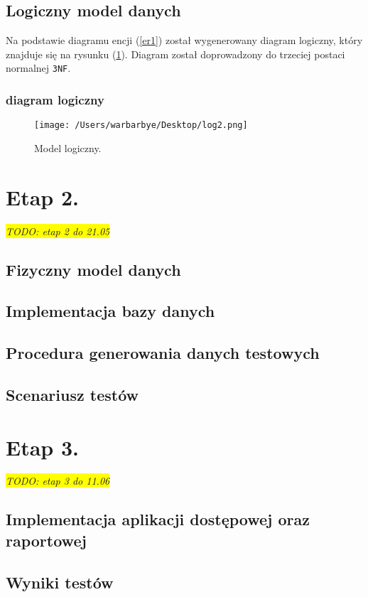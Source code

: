 \documentclass{article}
\newcommand{\todo}[1]{
	\colorbox{yellow} {{\color{red}
	\emph {TODO: #1}
}}}
\begin{document}
\subsection{Logiczny model danych}
Na podstawie diagramu encji (\ref{er1}) został wygenerowany diagram logiczny, który znajduje się na rysunku (\ref{log1}). Diagram został doprowadzony do trzeciej postaci normalnej \texttt{3NF}.
\subsubsection{diagram logiczny}
\begin{figure}[H]
			\centering

			\texttt{[image: /Users/warbarbye/Desktop/log2.png]}
					\label{log1}
			\caption{Model logiczny.}
\end{figure}

\section{Etap 2. \label{s2}}
\todo{etap 2 do 21.05}
\subsection{Fizyczny model danych}
\subsection{Implementacja bazy danych}
\subsection{Procedura generowania danych testowych}
\subsection{Scenariusz testów}
\section{Etap 3. \label{s3}}
\todo{etap 3 do 11.06}
\subsection{Implementacja aplikacji dostępowej oraz raportowej}
\subsection{Wyniki testów}
\end{document}
